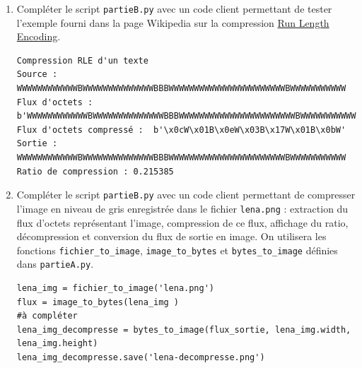 \documentclass[a4paper, french, 12pt]{article}  %
\begin{document}
\begin{enumerate}[resume]
\item Compléter le script \texttt{partieB.py} avec un code client permettant de tester l'exemple fourni dans la page Wikipedia sur la compression \href{https://fr.wikipedia.org/wiki/Run-length_encoding}{Run Length Encoding}.

\begin{verbatim}
Compression RLE d'un texte
Source :  WWWWWWWWWWWWBWWWWWWWWWWWWWWBBBWWWWWWWWWWWWWWWWWWWWWWWBWWWWWWWWWWW
Flux d'octets :  b'WWWWWWWWWWWWBWWWWWWWWWWWWWWBBBWWWWWWWWWWWWWWWWWWWWWWWBWWWWWWWWWWW'
Flux d'octets compressé :  b'\x0cW\x01B\x0eW\x03B\x17W\x01B\x0bW'
Sortie :  WWWWWWWWWWWWBWWWWWWWWWWWWWWBBBWWWWWWWWWWWWWWWWWWWWWWWBWWWWWWWWWWW
Ratio de compression : 0.215385
\end{verbatim}

\item Compléter le script \texttt{partieB.py} avec un code client permettant de compresser l'image en niveau de gris enregistrée dans le fichier \texttt{lena.png} : extraction du flux d'octets représentant l'image, compression de ce flux, affichage du ratio, décompression et conversion du flux de sortie en image. On utilisera les fonctions \texttt{fichier\_to\_image}, \texttt{image\_to\_bytes} et \texttt{bytes\_to\_image} définies dans \texttt{partieA.py}.

\begin{lstlisting}[style=rond]
lena_img = fichier_to_image('lena.png')
flux = image_to_bytes(lena_img )
#à compléter
lena_img_decompresse = bytes_to_image(flux_sortie, lena_img.width, lena_img.height)
lena_img_decompresse.save('lena-decompresse.png')
\end{lstlisting}


\end{enumerate}
\end{document}
